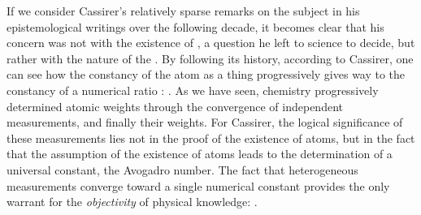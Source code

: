 \documentclass[submitted,12pt]{article}
\begin{document}

If we consider Cassirer’s relatively sparse remarks on the subject in his epistemological writings over the following decade, it becomes clear that his concern was not with the existence of , a question he left to science to decide, but rather with the nature of the  . By following its history, according to Cassirer, one can see how the constancy of the atom as a thing  progressively gives way to the constancy of a numerical ratio :  . As we have seen, chemistry progressively determined  atomic weights through the convergence of independent measurements, and finally their  weights. For Cassirer, the logical significance of these measurements lies not in the proof of the existence of atoms, but in the fact that the assumption of the existence of atoms leads to the determination of a universal constant, the Avogadro number. The fact that heterogeneous measurements converge toward a single numerical constant provides the only warrant for the \emph{objectivity} of physical knowledge:   .
\end{document}
